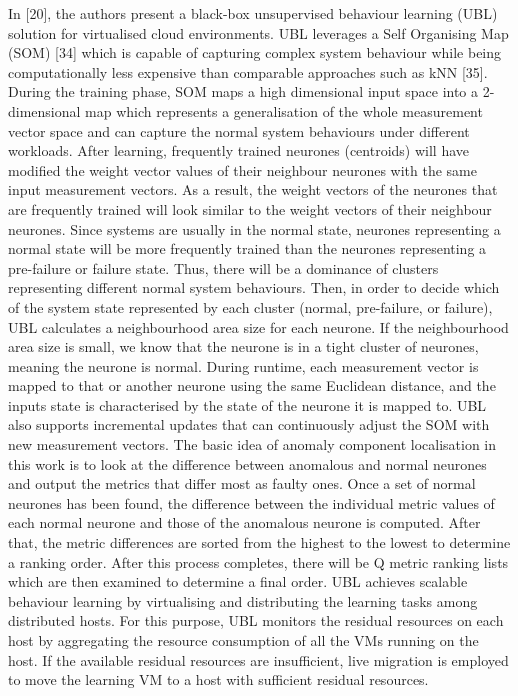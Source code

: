 \documentclass[]{usiinfprospectus}
\begin{document}
In [20], the authors present a black-box unsupervised behaviour learning (UBL) solution for virtualised cloud environments. UBL leverages a Self Organising Map (SOM) [34] which is capable of capturing complex system behaviour while being computationally less expensive than comparable approaches such as kNN [35]. During the training phase, SOM maps a high dimensional input space into a 2-dimensional map which represents a generalisation of the whole measurement vector space and can capture the normal system behaviours under different workloads. After learning, frequently trained neurones (centroids) will have modified the weight vector values of their neighbour neurones with the same input measurement vectors. As a result, the weight vectors of the neurones that are frequently trained will look similar to the weight vectors of their neighbour neurones. Since systems are usually in the normal state, neurones representing a normal state will be more frequently trained than the neurones representing a pre-failure or failure state. Thus, there will be a dominance of clusters representing different normal system behaviours. Then, in order to decide which of the system state represented by each cluster (normal, pre-failure, or failure), UBL calculates a neighbourhood area size for each neurone. If the neighbourhood area size is small, we know that the neurone is in a tight cluster of neurones, meaning the neurone is normal. During runtime, each measurement vector is mapped to that or another neurone using the same Euclidean distance, and the inputs state is characterised by the state of the neurone it is mapped to. UBL also supports incremental updates that can continuously adjust the SOM with new measurement vectors. The basic idea of anomaly component localisation in this work is to look at the difference between anomalous and normal neurones and output the metrics that differ most as faulty ones. Once a set of normal neurones has been found, the difference between the individual metric values of each normal neurone and those of the anomalous neurone is computed. After that, the metric differences are sorted from the highest to the lowest to determine a ranking order. After this process completes, there will be Q metric ranking lists which are then examined to determine a final order. UBL achieves scalable behaviour learning by virtualising and distributing the learning tasks among distributed hosts. For this purpose, UBL monitors the residual resources on each host by aggregating the resource consumption of all the VMs running on the host. If the available residual resources are insufficient, live migration is employed to move the learning VM to a host with sufficient residual resources.\\\\
\end{document}
